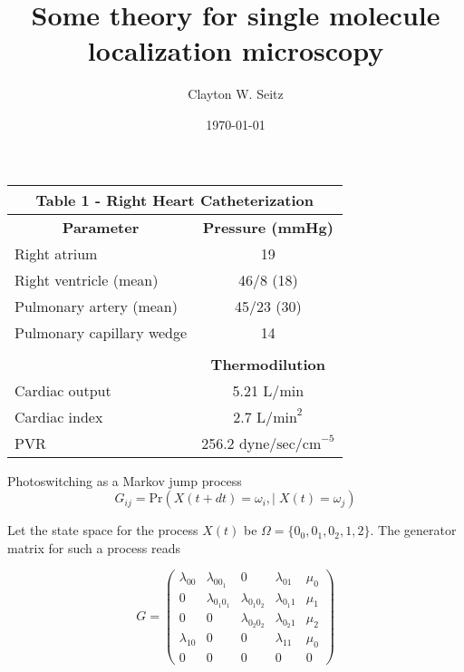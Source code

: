 \documentclass[aspectratio=169]{beamer}
\title{Some theory for single molecule localization microscopy}	%
\author{Clayton W. Seitz}								%
\date{\today}									%
\begin{document}
\begin{frame}
\begin{table}[]
\begin{tabular}{lc}
\multicolumn{2}{c}{\textbf{Table 1 - Right Heart Catheterization}} \\ \hline
\multicolumn{1}{c}{\textbf{Parameter}}  & \textbf{Pressure (mmHg)} \\
Right atrium                            & 19                       \\
Right ventricle (mean)                  & 46/8 (18)                \\
Pulmonary artery (mean)                 & 45/23 (30)               \\
Pulmonary capillary wedge               & 14                       \\
                                        & \multicolumn{1}{l}{}     \\
                                        & \textbf{Thermodilution}  \\
Cardiac output                          & 5.21 $\mathrm{L/min}$               \\
Cardiac index                           & 2.7 $\mathrm{L/min}^2$             \\
PVR                                     & 256.2 $\mathrm{dyne/sec/cm}^{-5}$     
\end{tabular}
\end{table}
\end{frame}

\begin{frame}
  \titlepage
\end{frame}

\begin{frame}{Photoswitching as a Markov jump process}
\begin{equation*}
G_{ij} = \mathrm{Pr}\left(X(t+dt)=\omega_{i}, | \;X(t)=\omega_{j}\right)
\end{equation*}

Let the state space for the process $X(t)$ be $\Omega = \{0_{0},0_{1},0_{2},1,2\}$. The generator matrix for such a process reads

\begin{equation*}
G = 
\begin{pmatrix}
\lambda_{00} & \lambda_{0 0_{1}} & 0 & \lambda_{01} & \mu_{0}\\
0 & \lambda_{0_{1}0_{1}} & \lambda_{0_{1}0_{2}} & \lambda_{0_{1}1} & \mu_{1}\\
0 & 0 & \lambda_{0_{2}0_{2}} & \lambda_{0_{2}1} & \mu_{2}\\
\lambda_{10} & 0 & 0 & \lambda_{11} & \mu_{0}\\
0 & 0 & 0 & 0 & 0
\end{pmatrix}
\end{equation*}
\end{frame}
\end{document}
